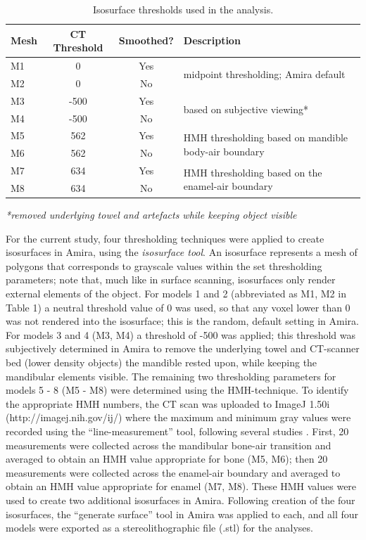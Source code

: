 \documentclass[review]{elsarticle}
\begin{document}
\begin{table}[tbh]\centering
\footnotesize
\caption{Isosurface thresholds used in the analysis.}
\centering
\begin{tabular}{lccp{6cm}}
\hline
Mesh & CT Threshold & Smoothed? & Description\\
\hline
M1 & 0 & Yes & \multirow{2}{5cm}{midpoint thresholding; Amira default}\\
M2 & 0 & No & \\
M3 & -500 & Yes & \multirow{2}{5cm}{based on subjective viewing*}\\
M4 & -500 & No & \\
M5 & 562 & Yes & \multirow{2}{5cm}{HMH thresholding based on mandible body-air boundary}\\
M6 & 562 & No & \\
M7 & 634 & Yes & \multirow{2}{5cm}{HMH thresholding based on the enamel-air boundary}\\
M8 & 634 & No & \\
\hline
\end{tabular}
\textit{*removed underlying towel and artefacts while keeping object visible }
\label{tab:Tbl1}
\end{table}

For the current study, four thresholding techniques were applied to create isosurfaces in Amira, using the \textit{isosurface tool}. An isosurface represents a mesh of polygons that corresponds to grayscale values within the set thresholding parameters; note that, much like in surface scanning, isosurfaces only render external elements of the object. For models 1 and 2 (abbreviated as M1, M2 in Table 1) a neutral threshold value of 0 was used, so that any voxel lower than 0 was not rendered into the isosurface; this is the random, default setting in Amira. For models 3 and 4 (M3, M4) a threshold of -500 was applied; this threshold was subjectively determined in Amira to remove the underlying towel and CT-scanner bed (lower density objects) the mandible rested upon, while keeping the mandibular elements visible. The remaining two thresholding parameters for models 5 - 8 (M5 - M8) were determined using the HMH-technique. To identify the appropriate HMH numbers, the CT scan was uploaded to ImageJ 1.50i  (http://imagej.nih.gov/ij/) where the maximum and minimum gray values were recorded using the “line-measurement” tool, following several studies \citep{RN5883,RN5882}. First, 20 measurements were collected across the mandibular bone-air transition and averaged to obtain an HMH value appropriate for bone (M5, M6); then 20 measurements were collected across the enamel-air boundary and averaged to obtain an HMH value appropriate for enamel (M7, M8). These HMH values were used to create two additional isosurfaces in Amira. Following creation of the four isosurfaces, the “generate surface” tool in Amira was applied to each, and all four models were exported as a stereolithographic file (.stl) for the analyses. 
\end{document}
